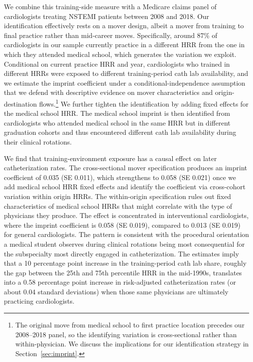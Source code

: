\documentclass[12pt]{article}
\begin{document}
We combine this training-side measure with a Medicare claims panel of cardiologists treating NSTEMI patients between 2008 and 2018. Our identification effectively rests on a mover design, albeit a mover from training to final practice rather than mid-career moves. Specifically, around 87\% of cardiologists in our sample currently practice in a different HRR from the one in which they attended medical school, which generates the variation we exploit. Conditional on current practice HRR and year, cardiologists who trained in different HRRs were exposed to different training-period cath lab availability, and we estimate the imprint coefficient under a conditional-independence assumption that we defend with descriptive evidence on mover characteristics and origin-destination flows.\footnote{The original move from medical school to first practice location precedes our 2008--2018 panel, so the identifying variation is cross-sectional rather than within-physician. We discuss the implications for our identification strategy in Section~\ref{sec:imprint}.} We further tighten the identification by adding fixed effects for the medical school HRR. The medical school imprint is then identified from cardiologists who attended medical school in the same HRR but in different graduation cohorts and thus encountered different cath lab availability during their clinical rotations.

We find that training-environment exposure has a causal effect on later catheterization rates. The cross-sectional mover specification produces an imprint coefficient of 0.035 (SE 0.011), which strengthens to 0.058 (SE 0.021) once we add medical school HRR fixed effects and identify the coefficient via cross-cohort variation within origin HRRs. The within-origin specification rules out fixed characteristics of medical school HRRs that might correlate with the type of physicians they produce. The effect is concentrated in interventional cardiologists, where the imprint coefficient is 0.058 (SE 0.019), compared to 0.013 (SE 0.019) for general cardiologists. The pattern is consistent with the procedural orientation a medical student observes during clinical rotations being most consequential for the subspecialty most directly engaged in catheterization. The estimates imply that a 10 percentage point increase in the training-period cath lab share, roughly the gap between the 25th and 75th percentile HRR in the mid-1990s, translates into a 0.58 percentage point increase in risk-adjusted catheterization rates (or about 0.04 standard deviations) when those same physicians are ultimately practicing cardiologists.
\end{document}
